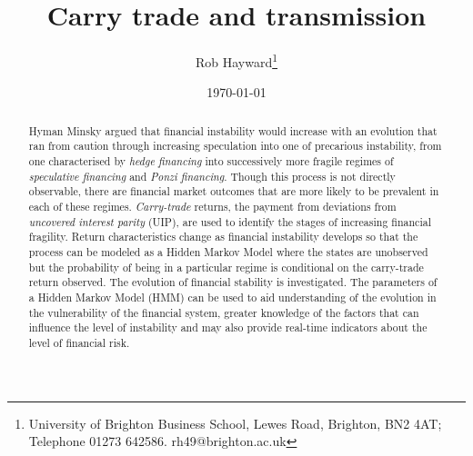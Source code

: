 \documentclass[12pt, a4paper, oneside]{article} %
\begin{document}
\title{Carry trade and transmission}
\author{Rob Hayward\footnote{University of Brighton Business School, Lewes Road, Brighton, BN2 4AT; Telephone 01273 642586.  rh49@brighton.ac.uk}}%
\date{\today}
\maketitle
\begin{abstract}
Hyman Minsky argued that financial instability would increase with an evolution that ran from caution through increasing speculation into one of precarious instability, from one characterised by \emph{hedge financing} into successively more fragile regimes of \emph{speculative financing} and \emph{Ponzi financing}.  Though this process is not directly observable, there are financial market outcomes that are more likely to be prevalent in each of these regimes.  \emph{Carry-trade} returns, the payment from deviations from \emph{uncovered interest parity} (UIP), are used to identify the stages of increasing financial fragility.  Return characteristics change as financial instability develops so that the process can be modeled as a Hidden Markov Model where the states are unobserved but the probability of being in a particular regime is conditional on the carry-trade return observed.  The evolution of financial stability is investigated. The parameters of a Hidden Markov Model (HMM) can be used to aid understanding of the evolution in the vulnerability of the financial system, greater knowledge of the factors that can influence the level of instability and may also provide real-time indicators about the level of financial risk. 

\end{abstract}
\end{document}
